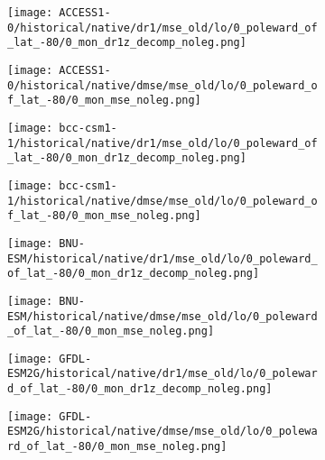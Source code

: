 \documentclass[preview]{standalone}
\begin{document}
\begin{figure}
  \begin{subfigure}[t]{0.5\textwidth}
    \texttt{[image: ACCESS1-0/historical/native/dr1/mse\_old/lo/0\_poleward\_of\_lat\_-80/0\_mon\_dr1z\_decomp\_noleg.png]}
  \end{subfigure}
  \begin{subfigure}[t]{0.5\textwidth}
    \texttt{[image: ACCESS1-0/historical/native/dmse/mse\_old/lo/0\_poleward\_of\_lat\_-80/0\_mon\_mse\_noleg.png]}
  \end{subfigure}
\end{figure}

\begin{figure}
  \begin{subfigure}[t]{0.5\textwidth}
    \texttt{[image: bcc-csm1-1/historical/native/dr1/mse\_old/lo/0\_poleward\_of\_lat\_-80/0\_mon\_dr1z\_decomp\_noleg.png]}
  \end{subfigure}
  \begin{subfigure}[t]{0.5\textwidth}
    \texttt{[image: bcc-csm1-1/historical/native/dmse/mse\_old/lo/0\_poleward\_of\_lat\_-80/0\_mon\_mse\_noleg.png]}
  \end{subfigure}
\end{figure}

\begin{figure}
  \begin{subfigure}[t]{0.5\textwidth}
    \texttt{[image: BNU-ESM/historical/native/dr1/mse\_old/lo/0\_poleward\_of\_lat\_-80/0\_mon\_dr1z\_decomp\_noleg.png]}
  \end{subfigure}
  \begin{subfigure}[t]{0.5\textwidth}
    \texttt{[image: BNU-ESM/historical/native/dmse/mse\_old/lo/0\_poleward\_of\_lat\_-80/0\_mon\_mse\_noleg.png]}
  \end{subfigure}
\end{figure}

\begin{figure}
  \begin{subfigure}[t]{0.5\textwidth}
    \texttt{[image: GFDL-ESM2G/historical/native/dr1/mse\_old/lo/0\_poleward\_of\_lat\_-80/0\_mon\_dr1z\_decomp\_noleg.png]}
  \end{subfigure}
  \begin{subfigure}[t]{0.5\textwidth}
    \texttt{[image: GFDL-ESM2G/historical/native/dmse/mse\_old/lo/0\_poleward\_of\_lat\_-80/0\_mon\_mse\_noleg.png]}
  \end{subfigure}
\end{figure}
\end{document}
